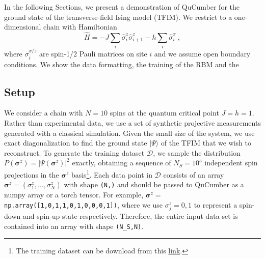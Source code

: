 \documentclass[submission, Phys]{SciPost}
\begin{document}
In the following Sections, we present a demonstration of QuCumber for the ground state of the transverse-field Ising model (TFIM). We restrict to a one-dimensional chain with Hamiltonian
\begin{equation}
	\hat{H} = -J\sum_i \hat{\sigma}^z_i \hat{\sigma}^z_{i+1} - h \sum_i\hat{\sigma}^x_i\:, \label{TFIM}
\end{equation}
where $\sigma^{x/z}_i$ are spin-1/2 Pauli matrices on site $i$ and we assume open boundary conditions. We show the data formatting, the training of the RBM and the 


\subsection{Setup}
\label{subsec:example}
We consider a chain with $N=10$ spins at the quantum critical point $J=h=1$. Rather than experimental data, we use a set of synthetic projective measurements generated with a classical simulation. Given the small size of the system, we use exact diagonalization to find the ground state $|\Psi\rangle$ of the TFIM that we wish to reconstruct. To generate the training dataset $\mathcal{D}$, we sample the distribution $P(\bm{\sigma}^z)=|\Psi(\bm{\sigma}^z)|^2$ exactly, obtaining a sequence of $N_S=10^5$ independent spin projections in the $\bm{\sigma}^z$ basis\footnote{The training dataset can be download from this \href{https://github.com/PIQuIL/QuCumber/blob/master/examples/Tutorial1_TrainPosRealWavefunction/tfim1d_data.txt}{link}.}. Each data point in $\mathcal{D}$ consists of an array $\bm{\sigma}^z=(\sigma^z_1,\dots,\sigma^z_N)$ with shape \verb|(N,)| and should be passed to QuCumber as a numpy array or a torch tensor. For example, $\bm{\sigma}^z=$ \verb|np.array([1,0,1,1,0,1,0,0,0,1])|,  where we use $\sigma_j^z=0,1$ to represent a spin-down and spin-up state respectively. Therefore, the entire input data set is contained into an array with shape \verb|(N_S,N)|.
\end{document}
